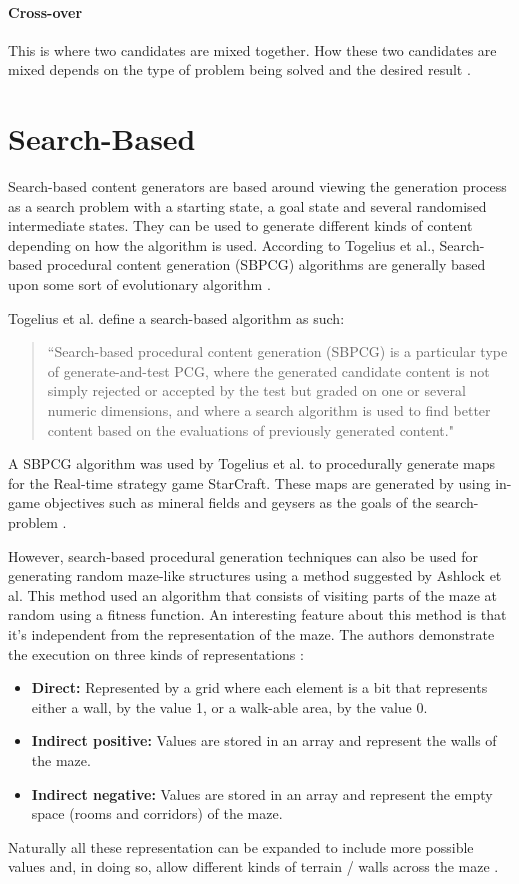 \paragraph{Cross-over} This is where two candidates are mixed together. How these two candidates are mixed depends on the type of problem being solved and the desired result \citep{DBLP:conf/ACMace/MouratoSB11}.

\section{Search-Based}
Search-based content generators are based around viewing the generation process as a search problem with a starting state, a goal state and several randomised intermediate states. They can be used to generate different kinds of content depending on how the algorithm is used. According to Togelius et al., Search-based procedural content generation (SBPCG) algorithms are generally based upon some sort of evolutionary algorithm \citep{DBLP:conf/cig/TogeliusPBWHY10}.

Togelius et al. define a search-based algorithm as such:
\begin{quote}
``Search-based procedural content generation (SBPCG) is a particular type of generate-and-test PCG, where the generated candidate content is not simply rejected or accepted by the test but graded on one or several numeric dimensions, and where a search algorithm is used to find better content based on the evaluations of previously generated content."\citep{DBLP:conf/cig/TogeliusPBWHY10}
\end{quote}

A SBPCG algorithm was used by Togelius et al. to procedurally generate maps for the Real-time strategy game StarCraft. These maps are generated by using in-game objectives such as mineral fields and geysers as the goals of the search-problem \citep{DBLP:conf/cig/TogeliusPBWHY10}.

However, search-based procedural generation techniques can also be used for generating random maze-like structures using a method suggested by Ashlock et al. This method used an algorithm that consists of visiting parts of the maze at random using a fitness function. An interesting feature about this method is that it's independent from the representation of the maze. The authors demonstrate the execution on three kinds of representations \citep{DBLP:journals/tciaig/AshlockLM11} :
\begin{itemize}
\item {\bf Direct:} Represented by a grid where each element is a bit that represents either a wall, by the value 1, or a walk-able area, by the value 0.
\item {\bf Indirect positive:} Values are stored in an array and represent the walls of the maze.
\item {\bf Indirect negative:} Values are stored in an array and represent the empty space (rooms and corridors) of the maze.
\end{itemize}
Naturally all these representation can be expanded to include more possible values and, in doing so, allow different kinds of terrain / walls across the maze \citep{DBLP:journals/cim/AshlockLM11}.

